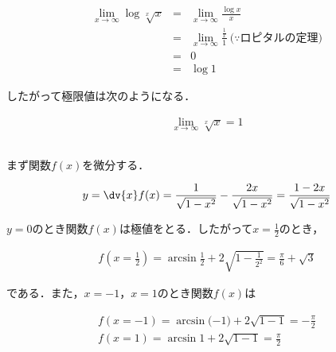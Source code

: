 \begin{eqnarray*}
  \lim_{x \to \infty} \log \sqrt[x]{x} &=& \lim_{x \to \infty} \frac{\log x}{x} \\
  &=& \lim_{x \to \infty} \frac{\frac{1}{x}}{1} \: \lparen \because ロピタルの定理 \rparen \\
  &=& 0 \\
  &=& \log 1
\end{eqnarray*}

したがって極限値は次のようになる．

\begin{gather*}
  \lim_{x \to \infty} \sqrt[x]{x} = 1
\end{gather*}


\subsection{}



\subsubsection{}

まず関数$f(x)$を微分する．

\begin{gather*}
  y = \dv{x} f(x) = \frac{1}{\sqrt{1-x^2}} - \frac{2x}{\sqrt{1-x^2}} = \frac{1-2x}{\sqrt{1-x^2}}
\end{gather*}

$y=0$のとき関数$f(x)$は極値をとる．したがって$x=\frac{1}{2}$のとき，

\begin{gather*}
  f(x=\frac{1}{2}) = \arcsin \frac{1}{2} + 2 \sqrt{1-\frac{1}{2^2}}
  = \frac{\pi}{6} + \sqrt{3}
\end{gather*}

である．また，$x=-1$，$x=1$のとき関数$f(x)$は

\begin{gather*}
  f(x=-1) = \arcsin \lparen -1 \rparen + 2 \sqrt{1-1} = - \frac{\pi}{2} \\
  f(x=1) = \arcsin 1 + 2 \sqrt{1-1} = \frac{\pi}{2}
\end{gather*}

